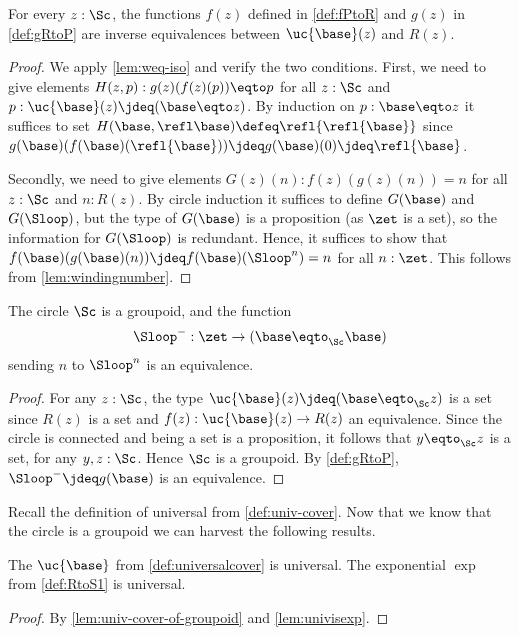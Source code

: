 \begin{theorem}
  \label{lem:univisexp}
For every $z:\Sc$, the functions $f(z)$ defined in \cref{def:fPtoR}
and $g(z)$ in \cref{def:gRtoP} are inverse equivalences between
$\uc{\base}(z)$ and $R(z)$.
\end{theorem}
\begin{proof}
We apply \cref{lem:weq-iso} and verify the two conditions.
  First, we need to give elements $H(z,p):g(z)(f(z)(p))\eqto p$
for all $z:\Sc$ and $p:\uc{\base}(z)\jdeq(\base\eqto z)$.
By induction on $p:\base\eqto z$ it suffices to set
$H(\base,\refl\base)\defeq\refl{\refl{\base}}$ since
$g(\base)(f(\base)(\refl{\base}))\jdeq g(\base)(0)\jdeq\refl{\base}$.

Secondly, we need to give elements $G(z)(n):f(z)(g(z)(n))=n$
for all $z:\Sc$ and $n: R(z)$.
By circle induction it suffices to define $G(\base)$ and $G(\Sloop)$,
but the type of $G(\base)$ is a proposition (as $\zet$ is a set),
so the information for $G(\Sloop)$ is redundant.
Hence, it suffices to show that
$f(\base)(g(\base)(n))\jdeq  f(\base)(\Sloop^n)= n$ for all $n:\zet$.
This follows from \cref{lem:windingnumber}.
\end{proof}

\begin{corollary}\label{cor:S1groupoid}
The circle $\Sc$ is a groupoid, and the function
\[
{\Sloop}^{-} : \zet\to(\base\eqto_{\Sc}\base)
\]
sending $n$ to $\Sloop^n$ is an equivalence.
\end{corollary}
\begin{proof}
For any $z:\Sc$, the type $\uc{\base}(z)\jdeq (\base\eqto_{\Sc}z)$ is a set
since $R(z)$ is a set and $f(z):\uc{\base}(z) \to R(z)$ an equivalence.
Since the circle is connected and being a set is a proposition, it follows
that $y\eqto_{\Sc}z$ is a set, for any $y,z:\Sc$. Hence $\Sc$ is a groupoid.
By \cref{def:gRtoP}, ${\Sloop}^{-}\jdeq g(\base)$ is an equivalence.
\end{proof}

Recall the definition of universal \covering from \cref{def:univ-cover}.
Now that we know that the circle is a groupoid we can harvest
the following results.

\begin{corollary}\label{cor:univ-covers-S1}
The \covering $\uc{\base}$ from \cref{def:universalcover} is universal.
The exponential \covering $\exp$ from \cref{def:RtoS1} is universal.
\end{corollary}
\begin{proof} By \cref{lem:univ-cover-of-groupoid} and \cref{lem:univisexp}.
\end{proof}


